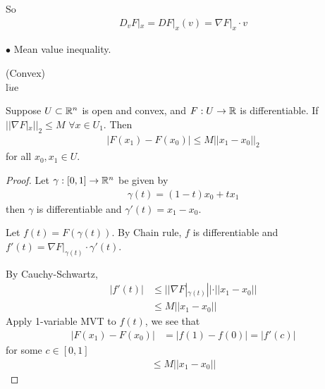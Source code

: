 \documentclass[a4paper]{article}
\begin{document}
So
\begin{equation*}
\begin{aligned}
D_v F|_x = DF|_x(v) = \nabla F|_x \cdot v
\end{aligned}
\end{equation*}

$\bullet$ Mean value inequality.

\begin{defi}(Convex)\\
l$\ddot{u}$e
\end{defi}

\begin{prop}
Suppose $U \subset \mathbb{R}^n$ is open and convex, and $F:U\to \mathbb{R}$ is differentiable. If $||\nabla F|_x||_2 \leq M$ $\forall x \in U_1$. Then
\begin{equation*}
\begin{aligned}
|F(x_1)-F(x_0)|\leq M||x_1-x_0||_2
\end{aligned}
\end{equation*}
for all $x_0,x_1 \in U$.
\begin{proof}
Let $\gamma:[0,1] \to \mathbb{R}^n$ be given by
\begin{equation*}
\begin{aligned}
\gamma(t)=(1-t)x_0 + tx_1
\end{aligned}
\end{equation*}
then $\gamma$ is differentiable and $\gamma'(t)=x_1-x_0$.

Let $f(t)=F(\gamma(t))$. By Chain rule, $f$ is differentiable and $f'(t)=\nabla F|_{\gamma(t)} \cdot \gamma'(t)$.

By Cauchy-Schwartz,
\begin{equation*}
\begin{aligned}
|f'(t)| &\leq ||\nabla F|_{\gamma(t)}|| \cdot ||x_1-x_0||\\
&\leq M||x_1-x_0||
\end{aligned}
\end{equation*}
Apply 1-variable MVT to $f(t)$, we see that 
\begin{equation*}
\begin{aligned}
|F(x_1)-F(x_0)| &= |f(1)-f(0)| = |f'(c)|
\end{aligned}
\end{equation*}
for some $c \in [0,1]$
\begin{equation*}
\begin{aligned}
\leq M||x_1-x_0||
\end{aligned}
\end{equation*}
\end{proof}
\end{prop}
\end{document}
